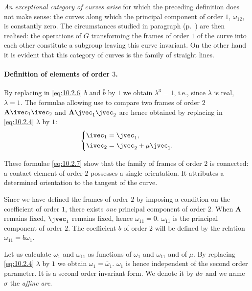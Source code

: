 \emph{An exceptional category of curves arise} for which the preceding definition does not make sense: the curves along which the principal component of order $1$, $\omega_{12}$, is constantly zero. The circumstances studied in paragraph  (p.~\pageref{sec:132}) are then realised: the operations of $G$ transforming the frames of order $1$ of the curve into each other constitute a subgroup leaving this curve invariant. On the other hand it is evident that this category of curves is the family of straight lines.

\paragraph{Definition of elements of order $3$.}
\label{sec:136}
By replacing in \eqref{eq:10.2.6} $b$ and $\bar b$ by $1$ we obtain $\lambda^{3}=1$, i.e., since $\lambda$ is real, $\lambda=1$. The formulae allowing use to compare two frames of order $2$ $\mathbf{A}\ivec_{1}\ivec_{2}$ and $\mathbf{A}\jvec_{1}\jvec_{2}$ are hence obtained by replacing in \eqref{eq:10.2.4} $\lambda$ by $1$:
\begin{equation}
  \label{eq:10.2.7}
  \left\{
    \begin{aligned}
      \ivec_{1}&=\jvec_{1},\\
      \ivec_{2}&=\jvec_{2}+\mu\jvec_{1}.
    \end{aligned}
  \right.
\end{equation}

These formulae \eqref{eq:10.2.7} show that the family of frames of order $2$ is connected: a contact element of order $2$ possesses a single orientation. It attributes a determined orientation to the tangent of the curve.

Since we have defined the frames of order $2$ by imposing a condition on the coefficient of order $1$, there exists \emph{one} principal component of order $2$. When $\mathbf{A}$ remains fixed, $\jvec_{1}$ remains fixed, hence $\omega_{11}=0$. $\omega_{11}$ is the principal component of order $2$. The coefficient $b$ of order $2$ will be defined by the relation $\omega_{11}=b\omega_{1}$.

Let us calculate $\omega_{1}$ and $\omega_{11}$ as functions of $\bar\omega_{1}$ and $\bar\omega_{11}$ and of $\mu$. By replacing \eqref{eq:10.2.4} $\lambda$ by $1$ we obtain $\omega_{1}=\bar\omega_{1}$. $\omega_{1}$ is hence independent of the second order parameter. It is a second order invariant form. We denote it by $d\sigma$ and we name $\sigma$ the \emph{affine arc}.

